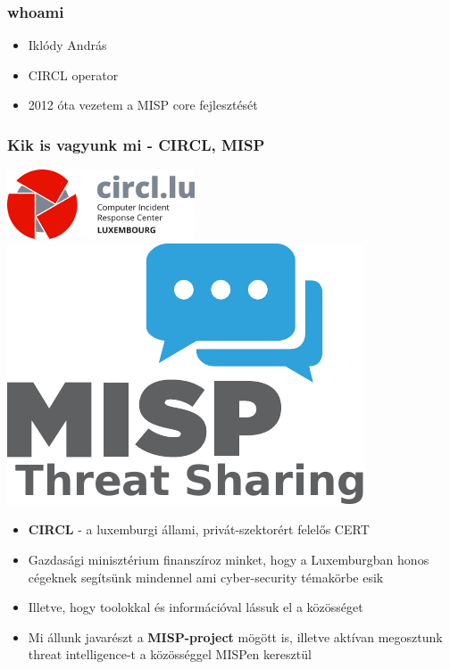 
\begin{frame}
\titlepage
\end{frame}

\begin{frame}
  \frametitle{whoami}
  \begin{itemize}
    \item Iklódy András
    \item CIRCL operator
    \item 2012 óta vezetem a MISP core fejlesztését
  \end{itemize}
\end{frame}

\begin{frame}
  \frametitle{Kik is vagyunk mi - CIRCL, MISP}
  \begin{center}
    \includegraphics[scale=0.45]{pics/circl.png}
    \hspace{2.5em}
    \includegraphics[scale=0.35]{pics/misp.pdf}
  \end{center}
  \begin{itemize}
    \item {\bf CIRCL} - a luxemburgi állami, privát-szektorért felelős CERT
    \item Gazdasági minisztérium finanszíroz minket, hogy a Luxemburgban honos cégeknek segítsünk mindennel ami cyber-security témakörbe esik
    \item Illetve, hogy toolokkal és információval lássuk el a közösséget
    \item Mi állunk javarészt a {\bf MISP-project} mögött is, illetve aktívan megosztunk threat intelligence-t a közösséggel MISPen keresztül
  \end{itemize}
\end{frame}

